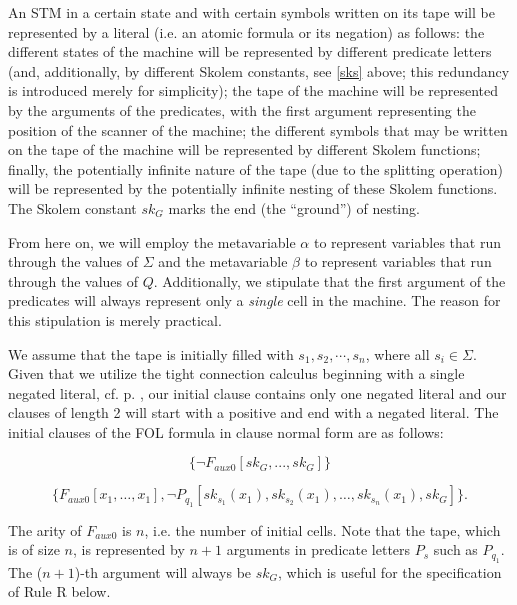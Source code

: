 \documentclass[%
  manuscript=article,   %
  year=2024,
  volume=77,
  doi=00000.000,
]{zfn}
\begin{document}
An STM in a certain state and with certain symbols written on its tape will be represented by a literal (i.e. an atomic formula or its negation) as follows: the different states of the machine will be represented by different predicate letters (and, additionally, by different Skolem constants, see \ref{sks} above; this redundancy is introduced merely for simplicity); the tape of the machine will be represented by the arguments of the predicates, with the first argument representing the position of the scanner of the machine; the different symbols that may be written on the tape of the machine will be represented by different Skolem functions; finally, the potentially infinite nature of the tape (due to the splitting operation) will be represented by the potentially infinite nesting of these Skolem functions. The Skolem constant $sk_G$ marks the end (the ``ground'') of nesting.

From here on, we will employ the metavariable $\alpha$ to represent variables that run through the values of $\Sigma$ and the metavariable $\beta$ to represent variables that run through the values of $Q$. Additionally, we stipulate that the first argument of the predicates will always represent only a \textit{single} cell in the machine. The reason for this stipulation is merely practical.

We assume that the tape is initially filled with $s_1, s_2,\cdots, s_n$, where all $s_i\in\Sigma$. 
Given that we utilize the tight connection calculus beginning with a single negated literal, cf. p. \pageref{onenegative}, our initial clause contains only one negated literal and our clauses of length 2 will start with a positive and end with a negated literal.
The initial clauses of the FOL formula in clause normal form are as follows:

\begin{equation}
\{\neg F_{aux0}[sk_G, ..., sk_G]\} \label{ini1}
\end{equation}

\begin{equation}
\{F_{aux0}[x_1, \ldots, x_1], \neg P_{q_1}[sk_{s_1}(x_1), sk_{s_2}(x_1), \ldots, sk_{s_n}(x_1), sk_G]\}. \label{ini2}
\end{equation}

The arity of $F_{aux0}$ is $n$, i.e. the number of initial cells.
Note that the tape, which is of size $n$, is represented by $n+1$ arguments in predicate letters $P_s$ such as $P_{q_1}$.
The ($n+1$)-th argument will always be $sk_G$, which is useful for the specification of Rule R below.
\end{document}
